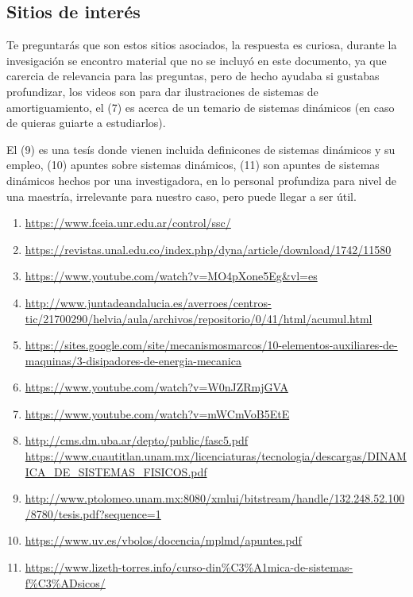 \documentclass[10pt]{article}
\begin{document}
	
	
	
	\nocite{*}
	
	
	\subsection{Sitios de interés}
	
	Te preguntarás que son estos sitios asociados, la respuesta es curiosa, durante la invesigación se encontro material que no se incluyó en este documento, ya que carercia de relevancia para las preguntas, pero de hecho ayudaba si gustabas profundizar, los videos son para dar ilustraciones de sistemas de amortiguamiento, el (7) es acerca de un temario de sistemas dinámicos (en caso de quieras guiarte a estudiarlos).
	
	El (9) es una tesís donde vienen incluida definicones de sistemas dinámicos y su empleo, (10) apuntes sobre sistemas dinámicos, (11) son apuntes de sistemas dinámicos hechos por una investigadora, en lo personal profundiza para nivel de una maestría, irrelevante para nuestro caso, pero puede llegar a ser útil.
	
	\begin{enumerate}
		\item \url{https://www.fceia.unr.edu.ar/control/ssc/}
		\item \url{https://revistas.unal.edu.co/index.php/dyna/article/download/1742/11580}
		\item \url{https://www.youtube.com/watch?v=MO4pXone5Eg&vl=es}
		\item \url{http://www.juntadeandalucia.es/averroes/centros-tic/21700290/helvia/aula/archivos/repositorio/0/41/html/acumul.html}
		\item \url{https://sites.google.com/site/mecanismosmarcos/10-elementos-auxiliares-de-maquinas/3-disipadores-de-energia-mecanica}
		\item \url{https://www.youtube.com/watch?v=W0nJZRmjGVA}
		\item \url{https://www.youtube.com/watch?v=mWCmVoB5EtE}
		\item \url{http://cms.dm.uba.ar/depto/public/fasc5.pdf}
		\url{https://www.cuautitlan.unam.mx/licenciaturas/tecnologia/descargas/DINAMICA_DE_SISTEMAS_FISICOS.pdf}
		\item \url{http://www.ptolomeo.unam.mx:8080/xmlui/bitstream/handle/132.248.52.100/8780/tesis.pdf?sequence=1}
		\item \url{https://www.uv.es/vbolos/docencia/mplmd/apuntes.pdf}
		\item \url{https://www.lizeth-torres.info/curso-din%C3%A1mica-de-sistemas-f%C3%ADsicos/}
	\end{enumerate}
\end{document}

